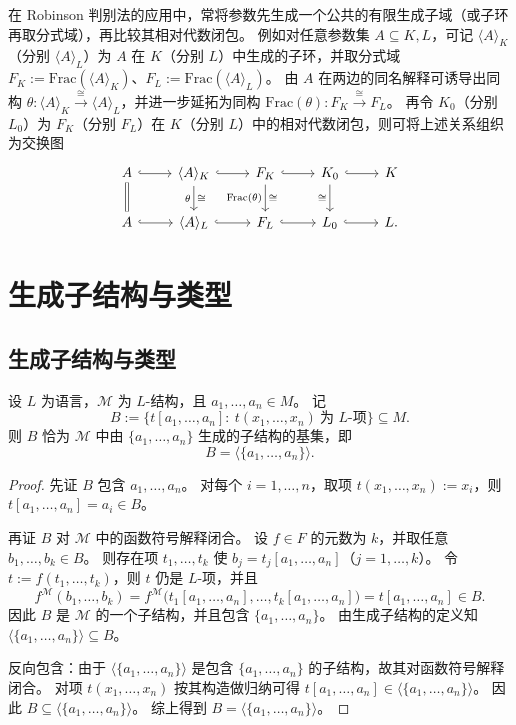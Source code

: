 \documentclass[lang=cn,a4paper,newtx,section]{elegantbook}
\begin{document}
\begin{remark}
在 Robinson 判别法的应用中，常将参数先生成一个公共的有限生成子域（或子环再取分式域），再比较其相对代数闭包。
例如对任意参数集 $A\subseteq K,L$，可记 $\langle A\rangle_K$（分别 $\langle A\rangle_L$）为 $A$ 在 $K$（分别 $L$）中生成的子环，并取分式域
$F_K:=\mathrm{Frac}(\langle A\rangle_K)$、$F_L:=\mathrm{Frac}(\langle A\rangle_L)$。
由 $A$ 在两边的同名解释可诱导出同构 $\theta:\langle A\rangle_K\overset{\cong}{\to}\langle A\rangle_L$，并进一步延拓为同构 $\mathrm{Frac}(\theta):F_K\overset{\cong}{\to}F_L$。
再令 $K_0$（分别 $L_0$）为 $F_K$（分别 $F_L$）在 $K$（分别 $L$）中的相对代数闭包，则可将上述关系组织为交换图
\[
\begin{tikzcd}
  A \arrow[r, hook] \arrow[d, equals] & \langle A\rangle_K \arrow[r, hook] \arrow[d, "\theta"', "\cong"] & F_K \arrow[r, hook] \arrow[d, "\mathrm{Frac}(\theta)"', "\cong"] & K_0 \arrow[r, hook] \arrow[d, "\cong"'] & K \\
  A \arrow[r, hook] & \langle A\rangle_L \arrow[r, hook] & F_L \arrow[r, hook] & L_0 \arrow[r, hook] & L.
\end{tikzcd}
\]
\end{remark}

\chapter{生成子结构与类型}

\section{生成子结构与类型}

\begin{lemma}[由参数生成的子结构的项刻画]
\label{generated-substructure-as-term-values}
设 $L$ 为语言，$\mathcal M$ 为 $L$-结构，且 $a_1,\dots,a_n\in M$。
记
\[
  B:=\bigl\{t[a_1,\dots,a_n]:\ t(x_1,\dots,x_n)\ \text{为 $L$-项}\bigr\}\subseteq M.
\]
则 $B$ 恰为 $\mathcal M$ 中由 $\{a_1,\dots,a_n\}$ 生成的子结构的基集，即
\[
  B=\langle\{a_1,\dots,a_n\}\rangle.
\]
\end{lemma}

\begin{proof}
先证 $B$ 包含 $a_1,\dots,a_n$。
对每个 $i=1,\dots,n$，取项 $t(x_1,\dots,x_n):=x_i$，则 $t[a_1,\dots,a_n]=a_i\in B$。

再证 $B$ 对 $\mathcal M$ 中的函数符号解释闭合。
设 $f\in F$ 的元数为 $k$，并取任意 $b_1,\dots,b_k\in B$。
则存在项 $t_1,\dots,t_k$ 使 $b_j=t_j[a_1,\dots,a_n]$（$j=1,\dots,k$）。
令 $t:=f(t_1,\dots,t_k)$，则 $t$ 仍是 $L$-项，并且
\[
  f^{\mathcal M}(b_1,\dots,b_k)=f^{\mathcal M}\bigl(t_1[a_1,\dots,a_n],\dots,t_k[a_1,\dots,a_n]\bigr)=t[a_1,\dots,a_n]\in B.
\]
因此 $B$ 是 $\mathcal M$ 的一个子结构，并且包含 $\{a_1,\dots,a_n\}$。
由生成子结构的定义知 $\langle\{a_1,\dots,a_n\}\rangle\subseteq B$。

反向包含：由于 $\langle\{a_1,\dots,a_n\}\rangle$ 是包含 $\{a_1,\dots,a_n\}$ 的子结构，故其对函数符号解释闭合。
对项 $t(x_1,\dots,x_n)$ 按其构造做归纳可得 $t[a_1,\dots,a_n]\in\langle\{a_1,\dots,a_n\}\rangle$。
因此 $B\subseteq\langle\{a_1,\dots,a_n\}\rangle$。
综上得到 $B=\langle\{a_1,\dots,a_n\}\rangle$。
\end{proof}
\end{document}
